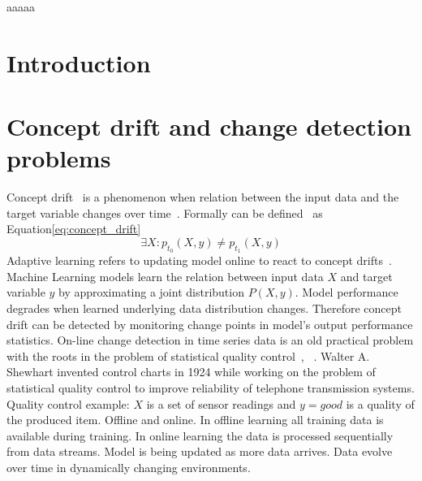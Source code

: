 \documentclass[licentiate,utf8,lot,loar,lof,shortloft,index]{jydiss}
\begin{document}
\preface
{} aaaaa
\acknowledgements
\begin{notations}
\end{notations}
\mainmatter

\chapter{Introduction}
\chapter{Concept drift and change detection problems}
Concept drift~\cite{schlimmer1986incremental,gama2014survey} is a
phenomenon when relation between the input data and the target variable changes
over time~\cite{gama2014survey}.
Formally can be defined~\cite{gama2014survey} as Equation\ref{eq:concept_drift} 
\begin{equation}\label{eq:concept_drift}
\exists X: p_{t_0}(X,y) \neq  p_{t_1}(X,y)
\end{equation}
Adaptive learning refers to updating model online to react to concept
drifts~\cite{gama2014survey}.
Machine Learning models learn the relation between input data $X$ and target
variable $y$ by approximating a joint distribution $P(X,y)$.  Model performance
degrades when learned underlying data distribution changes.  Therefore concept
drift can be detected by monitoring change points in model's output performance
statistics.
On-line change detection in time series data is an old practical problem with
the roots in the problem of statistical quality
control~\cite{basseville1993detection}, ~\cite{NISTbook}.  Walter A. Shewhart
invented control charts in 1924 while working on the problem of statistical
quality control to improve reliability of telephone transmission systems.
Quality control example: $X$ is a set of sensor readings and $y=good$ is a
quality of the produced item.
Offline and online.
In offline learning all training data is available during training.
In online learning the data is processed sequentially from data streams.
Model is being updated as more data arrives.
Data evolve over time in dynamically changing environments.
\end{document}

